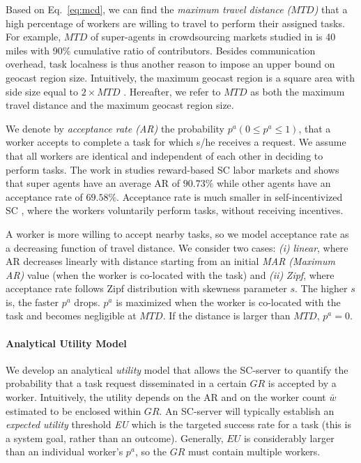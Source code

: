 \documentclass{USC-Thesis}
\numberwithin{equation}{chapter}
\begin{document}
Based on Eq.~\eqref{eq:mcd}, we can find the \textit{maximum travel distance ($\mathit{MTD}$)} that a high percentage of workers are willing to travel to perform their assigned tasks.
For example, $\mathit{MTD}$ of super-agents in crowdsourcing markets studied in \cite{musthag2013labor} is 40 miles with 90\% cumulative ratio of contributors. Besides communication overhead, task localness is thus another reason to impose an upper bound on geocast region size. Intuitively, the maximum geocast region is a square area with side size equal to $2 \times \mathit{MTD}$ . Hereafter, we refer to $\mathit{MTD}$ as both the maximum travel distance and the maximum geocast region size.

We denote by \textit{acceptance rate (AR)} the probability $p^a (0\le p^a \le 1)$, that a worker accepts to complete a task for which s/he receives a request. We assume that all workers are identical and independent of each other in deciding to perform tasks. The work in \cite{musthag2013labor} studies reward-based SC labor markets and shows that super agents have an average AR of $90.73\%$ while other agents have an acceptance rate of $69.58\%$. Acceptance rate is much smaller in self-incentivized SC \cite{kazemi2012geocrowd}, where the workers voluntarily perform tasks, without receiving incentives.

A worker is more willing to accept nearby tasks, so we model acceptance rate as a decreasing function of travel distance. We consider two cases: {\em (i)} {\em linear}, where AR decreases linearly with distance starting from an initial {\em MAR (Maximum AR)} value (when the worker is co-located with the task) and {\em (ii)} {\em Zipf}, where acceptance rate follows Zipf distribution with skewness parameter $s$.
The higher $s$ is, the faster $p^a$ drops. $p^a$ is maximized when the worker is co-located with the task and becomes negligible at $\mathit{MTD}$. If the distance is larger than $\mathit{MTD}$, $p^a=0$.

\paragraph{Analytical Utility Model}
\label{sec:utility_model}
We develop an analytical {\em utility} model that allows the SC-server to quantify the probability that a task request disseminated in a certain $\mathit{GR}$ is accepted by a worker. Intuitively, the utility depends on the AR and on the worker count $\bar{w}$ estimated to be enclosed within $\mathit{GR}$. An SC-server will typically establish an {\em expected utility} threshold {\em EU} which is the targeted success rate for a task (this is a system goal, rather than an outcome).
Generally, $\mathit{EU}$ is considerably larger than an individual worker's $p^a$, so the $\mathit{GR}$ must contain multiple workers. 
\end{document}
